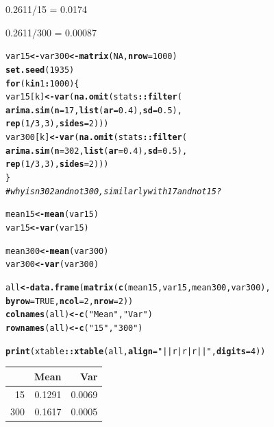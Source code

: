 \documentclass[11pt]{article}\usepackage[]{graphicx}\usepackage[]{color}
\makeatletter
\newcommand{\hlnum}[1]{\textcolor[rgb]{0,0,0}{#1}}%
\newcommand{\hlstr}[1]{\textcolor[rgb]{0,0,0}{#1}}%
\newcommand{\hlcom}[1]{\textcolor[rgb]{0.4,0.4,0.4}{\textit{#1}}}%
\newcommand{\hlopt}[1]{\textcolor[rgb]{0,0,0}{\textbf{#1}}}%
\newcommand{\hlstd}[1]{\textcolor[rgb]{0,0,0}{#1}}%
\newcommand{\hlkwa}[1]{\textcolor[rgb]{0,0,0}{\textbf{#1}}}%
\newcommand{\hlkwb}[1]{\textcolor[rgb]{0,0,0}{\textbf{#1}}}%
\newcommand{\hlkwc}[1]{\textcolor[rgb]{0,0,0}{\textbf{#1}}}%
\newcommand{\hlkwd}[1]{\textcolor[rgb]{0,0,0}{\textbf{#1}}}%
\newenvironment{kframe}{%
 \def\at@end@of@kframe{}%
 \ifinner\ifhmode%
  \def\at@end@of@kframe{\end{minipage}}%
  \begin{minipage}{\columnwidth}%
 \fi\fi%
 \def\FrameCommand##1{\hskip\@totalleftmargin \hskip-\fboxsep
 \colorbox{shadecolor}{##1}\hskip-\fboxsep
     \hskip-\linewidth \hskip-\@totalleftmargin \hskip\columnwidth}%
 \MakeFramed {\advance\hsize-\width
   \@totalleftmargin\z@ \linewidth\hsize
   \@setminipage}}%
 {\par\unskip\endMakeFramed%
 \at@end@of@kframe}
\makeatother
\begin{document}
\begin{enumerate}
\begin{enumerate}
0.2611/15 = 0.0174

0.2611/300 = 0.00087

\begin{kframe}
\begin{alltt}
\hlstd{var15}\hlkwb{<-}\hlstd{var300}\hlkwb{<-}\hlkwd{matrix}\hlstd{(}\hlnum{NA}\hlstd{,}\hlkwc{nrow}\hlstd{=}\hlnum{1000}\hlstd{)}
\hlkwd{set.seed}\hlstd{(}\hlnum{1935}\hlstd{)}
\hlkwa{for} \hlstd{(k} \hlkwa{in} \hlnum{1}\hlopt{:}\hlnum{1000}\hlstd{)\{}
  \hlstd{var15[k]}\hlkwb{<-}\hlkwd{var}\hlstd{(}\hlkwd{na.omit}\hlstd{(stats}\hlopt{::}\hlkwd{filter}\hlstd{(}
    \hlkwd{arima.sim}\hlstd{(}\hlkwc{n}\hlstd{=}\hlnum{17}\hlstd{,}\hlkwd{list}\hlstd{(}\hlkwc{ar}\hlstd{=}\hlnum{0.4}\hlstd{),}\hlkwc{sd}\hlstd{=}\hlnum{0.5}\hlstd{),}
    \hlkwd{rep}\hlstd{(}\hlnum{1}\hlopt{/}\hlnum{3}\hlstd{,}\hlnum{3}\hlstd{),}\hlkwc{sides}\hlstd{=}\hlnum{2}\hlstd{)))}
  \hlstd{var300[k]}\hlkwb{<-}\hlkwd{var}\hlstd{(}\hlkwd{na.omit}\hlstd{(stats}\hlopt{::}\hlkwd{filter}\hlstd{(}
    \hlkwd{arima.sim}\hlstd{(}\hlkwc{n}\hlstd{=}\hlnum{302}\hlstd{,}\hlkwd{list}\hlstd{(}\hlkwc{ar}\hlstd{=}\hlnum{0.4}\hlstd{),}\hlkwc{sd}\hlstd{=}\hlnum{0.5}\hlstd{),}
    \hlkwd{rep}\hlstd{(}\hlnum{1}\hlopt{/}\hlnum{3}\hlstd{,}\hlnum{3}\hlstd{),}\hlkwc{sides}\hlstd{=}\hlnum{2}\hlstd{)))}
\hlstd{\}}
\hlcom{#why is n 302 and not 300, similarly with 17 and not 15?}


\hlstd{mean15} \hlkwb{<-} \hlkwd{mean}\hlstd{(var15)}
\hlstd{var15} \hlkwb{<-} \hlkwd{var}\hlstd{(var15)}

\hlstd{mean300} \hlkwb{<-} \hlkwd{mean}\hlstd{(var300)}
\hlstd{var300} \hlkwb{<-} \hlkwd{var}\hlstd{(var300)}

\hlstd{all} \hlkwb{<-} \hlkwd{data.frame}\hlstd{(}\hlkwd{matrix}\hlstd{(}\hlkwd{c}\hlstd{(mean15, var15, mean300, var300),}
                         \hlkwc{byrow} \hlstd{=} \hlnum{TRUE}\hlstd{,} \hlkwc{ncol} \hlstd{=} \hlnum{2}\hlstd{,} \hlkwc{nrow} \hlstd{=} \hlnum{2}\hlstd{))}
\hlkwd{colnames}\hlstd{(all)} \hlkwb{<-} \hlkwd{c}\hlstd{(}\hlstr{"Mean"}\hlstd{,} \hlstr{"Var"}\hlstd{)}
\hlkwd{rownames}\hlstd{(all)} \hlkwb{<-} \hlkwd{c}\hlstd{(}\hlstr{"15"}\hlstd{,} \hlstr{"300"}\hlstd{)}

\hlkwd{print}\hlstd{(xtable}\hlopt{::}\hlkwd{xtable}\hlstd{(all,} \hlkwc{align} \hlstd{=} \hlstr{"||r|r|r||"}\hlstd{,} \hlkwc{digits} \hlstd{=} \hlnum{4}\hlstd{))}
\end{alltt}
\end{kframe}%
\begin{table}[H]
\centering
\begin{tabular}{||r|r|r||}
  \hline
 & Mean & Var \\ 
  \hline
15 & 0.1291 & 0.0069 \\ 
  300 & 0.1617 & 0.0005 \\ 
   \hline
\end{tabular}
\end{table}


\end{enumerate}
\end{enumerate}
\end{document}
